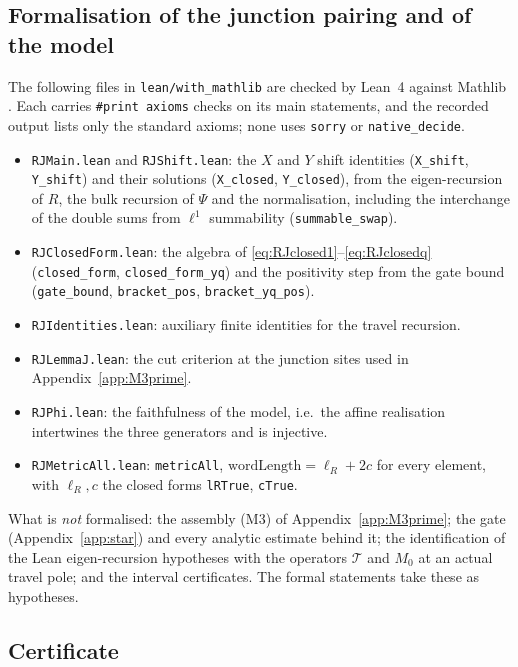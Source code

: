 \documentclass[11pt]{article}
\theoremstyle{plain}
\theoremstyle{definition}
\theoremstyle{remark}
\begin{document}
\subsection{Formalisation of the junction pairing and of the model}\label{sec:RJlean}

The following files in \texttt{lean/with\_mathlib} are checked by Lean~4 against Mathlib
\cite{MathlibCommunity}. Each carries \texttt{\#print axioms} checks on its main statements, and the
recorded output lists only the standard axioms; none uses \texttt{sorry} or
\texttt{native\_decide}.
\begin{itemize}
\item \texttt{RJMain.lean} and \texttt{RJShift.lean}: the $X$ and $Y$ shift identities
(\texttt{X\_shift}, \texttt{Y\_shift}) and their solutions (\texttt{X\_closed}, \texttt{Y\_closed}),
from the eigen-recursion of $R$, the bulk recursion of $\Psi$ and the normalisation, including the
interchange of the double sums from $\ell^1$ summability (\texttt{summable\_swap}).
\item \texttt{RJClosedForm.lean}: the algebra of \eqref{eq:RJclosed1}--\eqref{eq:RJclosedq}
(\texttt{closed\_form}, \texttt{closed\_form\_yq}) and the positivity step from the gate bound
(\texttt{gate\_bound}, \texttt{bracket\_pos}, \texttt{bracket\_yq\_pos}).
\item \texttt{RJIdentities.lean}: auxiliary finite identities for the travel recursion.
\item \texttt{RJLemmaJ.lean}: the cut criterion at the junction sites used in
Appendix~\ref{app:M3prime}.
\item \texttt{RJPhi.lean}: the faithfulness of the model, i.e.\ the affine realisation intertwines
the three generators and is injective.
\item \texttt{RJMetricAll.lean}: \texttt{metricAll}, $\mathrm{wordLength}=\ell_R+2c$ for every
element, with $\ell_R,c$ the closed forms \texttt{lRTrue}, \texttt{cTrue}.
\end{itemize}
What is \emph{not} formalised: the assembly \textup{(M3)} of Appendix~\ref{app:M3prime}; the gate
(Appendix~\ref{app:star}) and every analytic estimate behind it; the identification of the Lean
eigen-recursion hypotheses with the operators $\mathcal T$ and $M_0$ at an actual travel pole; and
the interval certificates. The formal statements take these as hypotheses.

\subsection{Certificate}\label{sec:assemblycert}
\end{document}
